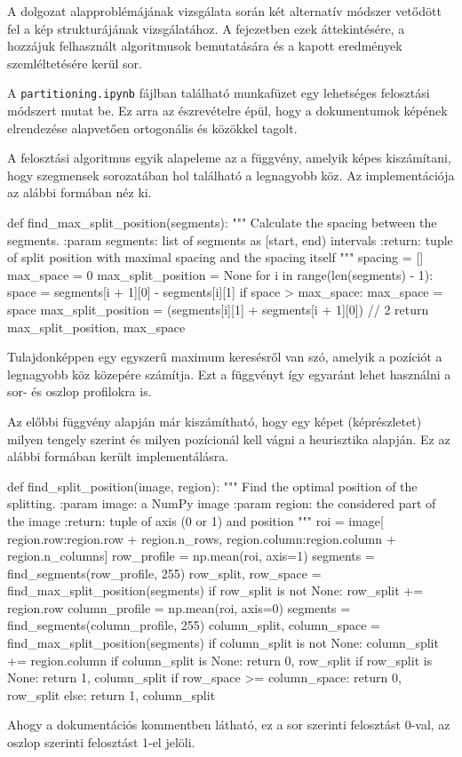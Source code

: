
A dolgozat alapproblémájának vizsgálata során két alternatív módszer vetődött fel a kép strukturájának vizsgálatához.
A fejezetben ezek áttekintésére, a hozzájuk felhasznált algoritmusok bemutatására és a kapott eredmények szemléltetésére kerül sor.


A \texttt{partitioning.ipynb} fájlban található munkafüzet egy lehetséges felosztási módszert mutat be. Ez arra az észrevételre épül, hogy a dokumentumok képének elrendezése alapvetően ortogonális és közökkel tagolt.

A felosztási algoritmus egyik alapeleme az a függvény, amelyik képes kiszámítani, hogy szegmensek sorozatában hol található a legnagyobb köz. Az implementációja az alábbi formában néz ki.
\begin{python}
def find_max_split_position(segments):
    """
    Calculate the spacing between the segments.
    :param segments: list of segments as [start, end) intervals
    :return: tuple of split position with maximal spacing
             and the spacing itself
    """
    spacing = []
    max_space = 0
    max_split_position = None
    for i in range(len(segments) - 1):
        space = segments[i + 1][0] - segments[i][1]
        if space > max_space:
            max_space = space
            max_split_position =
                (segments[i][1] + segments[i + 1][0]) // 2
    return max_split_position, max_space
\end{python}
Tulajdonképpen egy egyszerű maximum keresésről van szó, amelyik a pozíciót a legnagyobb köz közepére számítja.
Ezt a függvényt így egyaránt lehet használni a sor- és oszlop profilokra is.

Az előbbi függvény alapján már kiszámítható, hogy egy képet (képrészletet) milyen tengely szerint és milyen pozícionál kell vágni a heurisztika alapján.
Ez az alábbi formában került implementálásra.
\begin{python}
def find_split_position(image, region):
    """
    Find the optimal position of the splitting.
    :param image: a NumPy image
    :param region: the considered part of the image
    :return: tuple of axis (0 or 1) and position
    """
    roi = image[
        region.row:region.row + region.n_rows,
        region.column:region.column + region.n_columns]
    row_profile = np.mean(roi, axis=1)
    segments = find_segments(row_profile, 255)
    row_split, row_space = find_max_split_position(segments)
    if row_split is not None:
        row_split += region.row
    column_profile = np.mean(roi, axis=0)
    segments = find_segments(column_profile, 255)
    column_split, column_space = find_max_split_position(segments)
    if column_split is not None:
        column_split += region.column
    if column_split is None:
        return 0, row_split
    if row_split is None:
        return 1, column_split
    if row_space >= column_space:
        return 0, row_split
    else:
        return 1, column_split
\end{python}
Ahogy a dokumentációs kommentben látható, ez a sor szerinti felosztást 0-val, az oszlop szerinti felosztást 1-el jelöli.


